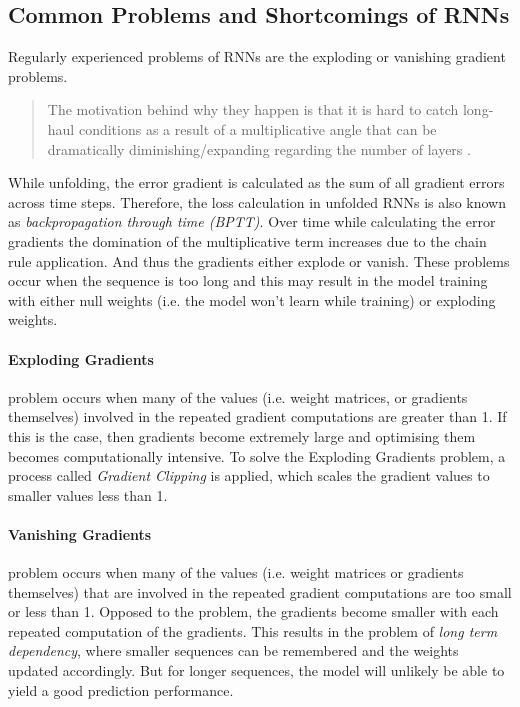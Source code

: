         \subsection{Common Problems and Shortcomings of RNNs}
        \label{sec:shortcomings-of-rnns-background}

            Regularly experienced problems of RNNs are the exploding or vanishing gradient problems.
            \begin{quote}
                The motivation behind why they happen is that it is hard to catch long-haul conditions as a result of a multiplicative angle that can be dramatically diminishing/expanding regarding the number of layers \cite{parikhDisadvantagesRNN2021}.
            \end{quote}
            While unfolding, the error gradient is calculated as the sum of all gradient errors across time steps. Therefore, the loss calculation in unfolded RNNs is also known as \emph{backpropagation through time (BPTT)}.
            Over time while calculating the error gradients the domination of the multiplicative term increases due to the chain rule application. And thus the gradients either explode or vanish.
            These problems occur when the sequence is too long and this may result in the model training with either null weights (i.e. the model won't learn while training) or exploding weights.
            
            \paragraph{Exploding Gradients }
            \label{par:exploding-gradients-background}

                problem occurs when many of the values (i.e. weight matrices, or gradients themselves) involved in the repeated gradient computations are greater than 1. 
                If this is the case, then gradients become extremely large and optimising them becomes computationally intensive.
                To solve the Exploding Gradients problem, a process called \emph{Gradient Clipping} is applied, which scales the gradient values to smaller values less than 1.


            \paragraph{Vanishing Gradients }
            \label{par:vanishing-gradients-background}

                 problem occurs when many of the values (i.e. weight matrices or gradients themselves) that are involved in the repeated gradient computations are too small or less than 1. Opposed to the  problem, the gradients become smaller with each repeated computation of the gradients.
                This results in the problem of \emph{long term dependency}, where smaller sequences can be remembered and the weights updated accordingly. But for longer sequences, the model will unlikely be able to yield a good prediction performance.

